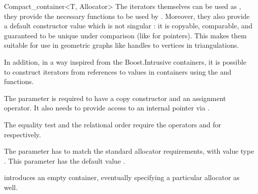 \begin{ccRefClass}{Compact_container<T, Allocator>}
  The iterators themselves can be used as , they provide the necessary
  functions to be used by .  Moreover, they
  also provide a default constructor value which is not singular : it is
  copyable, comparable, and guaranteed to be unique under comparison
  (like  for pointers).  This makes them suitable for use in
  geometric graphs like handles to vertices in triangulations.

  In addition, in a way inspired from the Boost.Intrusive containers, it is
  possible to construct iterators from references to values in containers
  using the  and  functions.


  \ccParameters

  The parameter  is required to have a copy constructor and an
  assignment operator.  It also needs to provide access to an internal
  pointer via .

  The equality test and the relational order require the operators
  \ccStyle{==} and \ccStyle{<} for  respectively.

  The parameter  has to match the standard allocator
  requirements, with value type .  This parameter has the default
  value .

  \ccTypes
  \ccPropagateThreeToTwoColumns

  \ccGlue
  \ccGlue
  \ccGlue
  \ccGlue
  \ccGlue
  \ccGlue

  \ccGlue
  \ccGlue
  \ccGlue


  \ccCreation

  {introduces an empty container, eventually specifying a particular
   allocator  as well.}


\end{ccRefClass}
